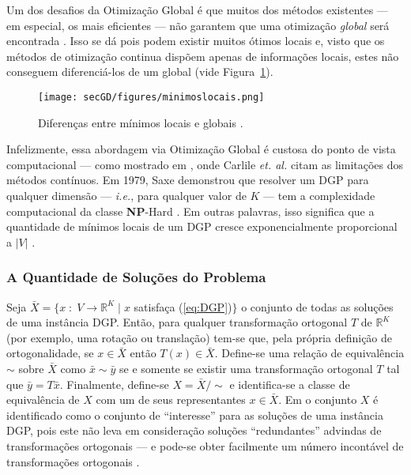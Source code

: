Um dos desafios da Otimização Global é que muitos dos métodos existentes --- em especial, os mais eficientes --- não garantem que uma otimização \textit{global} será encontrada . Isso se dá pois podem existir muitos ótimos locais e, visto que os métodos de otimização continua dispõem apenas de informações locais, estes não conseguem diferenciá-los de um global \cite{carlileBook31Coloquio} (vide Figura~\ref{fig:minimoslocais}). %
\begin{figure}[H]
	\begin{center}
		\texttt{[image: secGD/figures/minimoslocais.png]}
	\end{center}
	\caption{Diferenças entre mínimos locais e globais \cite{carlileBook31Coloquio}.}
	\label{fig:minimoslocais}
\end{figure}

Infelizmente, essa abordagem via Otimização Global é custosa do ponto de vista computacional --- como mostrado em \cite{carlileRecentAdvancesMDGP}, onde Carlile \textit{et. al.} citam as limitações dos métodos contínuos. Em 1979, Saxe demonstrou que resolver um DGP para qualquer dimensão --- \textit{i.e.}, para qualquer valor de $K$ --- tem a complexidade computacional da classe \textbf{NP}-Hard \cite{Saxe:79}. Em outras palavras, isso significa que a quantidade de mínimos locais de um DGP cresce exponencialmente proporcional a $|V|$ \cite{carlileIntroductionMDGP}. 

\subsubsection{A Quantidade de Soluções do Problema}

Seja $\bar{X} = \{x\; : \; V \rightarrow \mathbb{R}^K \; | \;x $ satisfaça (\ref{eq:DGP})$\}$ o conjunto de todas as soluções de uma instância DGP. Então, para qualquer transformação ortogonal $T$ de $\mathbb{R}^K$ (por exemplo, uma rotação ou translação) tem-se que, pela própria definição de ortogonalidade, se $x\in \bar{X}$ então $T(x) \in \bar{X}$. Define-se uma relação de equivalência $\sim$ sobre $\bar{X}$ como $\bar{x} \sim\bar{y}$ se e somente se existir uma transformação ortogonal $T$ tal que $\bar{y} = T\bar{x}$. Finalmente, define-se $X = \bar{X} /\sim$ e identifica-se a classe de equivalência de $X$ com um de seus representantes $x\in \bar{X}$. Em \cite{carlileRecentAdvancesMDGP} o conjunto $X$ é identificado como o conjunto de ``interesse'' para as soluções de uma instância DGP, pois este não leva em consideração soluções ``redundantes'' advindas de transformações ortogonais  --- e pode-se obter facilmente um número incontável de transformações ortogonais \cite{libertiMdgpContinousToDiscrete}.
\\


